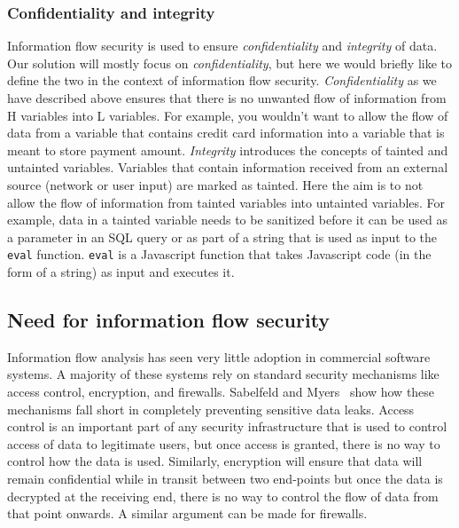 \subsubsection{Confidentiality and integrity}
Information flow security is used to ensure \textit{confidentiality} and \textit{integrity}
of data. Our solution will mostly focus on \textit{confidentiality}, but here we would
briefly like to define the two in the context of information flow security.
\textit{Confidentiality} as we have described above ensures that there is no unwanted
flow of information from H variables into L variables. For example, you wouldn't
want to allow the flow of data from a variable that contains credit card information
into a variable that is meant to store payment amount. \textit{Integrity} introduces
the concepts of tainted and untainted variables. Variables that contain information
received from an external source (network or user input) are marked as tainted. Here
the aim is to not allow the flow of information from tainted variables into untainted
variables. For example, data in a tainted variable needs to be sanitized before it
can be used as a parameter in an SQL query or as part of a string that is used as
input to the \texttt{eval} function. \texttt{eval} is a Javascript function that
takes Javascript code (in the form of a string) as input and executes it.

\subsection{Need for information flow security}
Information flow analysis has seen very little adoption in commercial software systems.
A majority of these systems rely on standard security mechanisms like access control,
encryption, and firewalls. Sabelfeld and Myers~\cite{LangInfo} show how these mechanisms
fall short in completely preventing sensitive data leaks. Access control is an
important part of any security infrastructure that is used to control access of
data to legitimate users, but once access is granted, there is no way to control
how the data is used. Similarly, encryption will ensure that data will remain
confidential while in transit between two end-points but once the data is decrypted
at the receiving end, there is no way to control the flow of data from that point
onwards. A similar argument can be made for firewalls.

